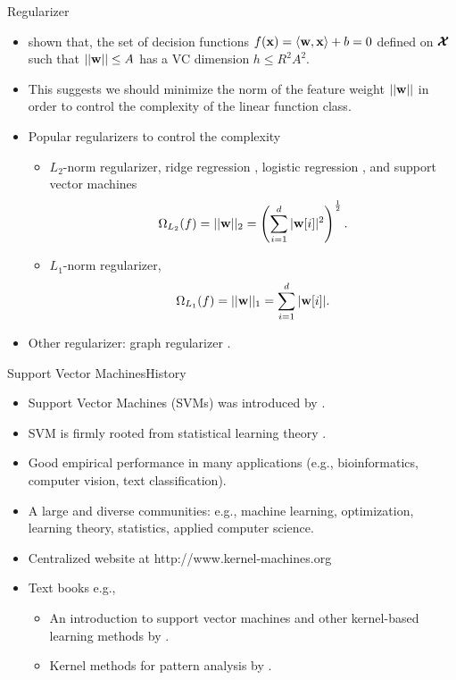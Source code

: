 \documentclass[first=dgreen,second=purple,logo=yellowexc]{aaltoslides}
\begin{document}
{\begin{frame}{Regularizer}
	\begin{itemize}
		\item \citet{Vapnik92principles} shown that, the set of decision functions $f(\mathbf {x})=\langle \mathbf {w}, \mathbf {x} \rangle+b=0$ defined on $\pmb {\mathcal{X}}$ such that $||\mathbf {w}||\le A$ has a VC dimension $h\le R^2A^2$.
		\item This suggests we should minimize the norm of the feature weight $||\mathbf {w}||$ in order to control the complexity of the linear function class. 
		\item Popular regularizers to control the complexity
		\begin{itemize}
			\footnotesize
			\item $L_2$-norm regularizer, ridge regression \citep{Hoerl00ridge}, logistic regression \citep{Chen00}, and support vector machines \citep{Cortes95support}
			\begin{align*}
				\Omega_{L_2}(f) = ||\mathbf {w}||_2=\left(\sum_{i=1}^d|\mathbf {w}[i]|^2\right)^{\frac{1}{2}}.
			\end{align*}
			\item $L_1$-norm regularizer, \lasso\ \citep{Tibshirani94regression}
			\begin{align*}
				\Omega_{L_1}(f) = ||\mathbf {w}||_1=\sum_{i=1}^d|\mathbf {w}[i]|.
			\end{align*}
		\end{itemize}
		\item Other regularizer: graph regularizer \citep{Zhou04learning}.
	\end{itemize}
\end{frame}


\begin{frame}{Support Vector Machines}{History}
	\begin{itemize}
		\item Support Vector Machines (SVMs) was introduced by \citet{Boser92, Cortes95support}.
		\item SVM is firmly rooted from statistical learning theory \citep{Vapnik98statistical}.
		\item Good empirical performance in many applications (e.g., bioinformatics, computer vision, text classification).
		\item A large and diverse communities: e.g., machine learning, optimization, learning theory, statistics, applied computer science.
		\item Centralized website at http://www.kernel-machines.org
		\item Text books e.g.,
		\begin{itemize}
			\footnotesize
			\item An introduction to support vector machines and other kernel-based learning methods by \citet{Taylor00an}.
			\item Kernel methods for pattern analysis by \citet{Taylor04kernel}.
		\end{itemize}
	\end{itemize}
\end{frame}

}
\end{document}
